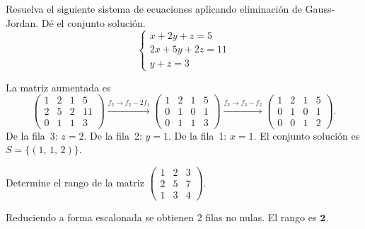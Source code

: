 \documentclass{emate-ucr}
\begin{document}
\begin{ejercicio}[10]
  Resuelva el siguiente sistema de ecuaciones aplicando eliminación de
  Gauss-Jordan. Dé el conjunto solución.
  \[
    \begin{cases}
       x + 2y +  z =  5 \\
      2x + 5y + 2z = 11 \\
           y +  z =  3
    \end{cases}
  \]

  \begin{solucion}
    La matriz aumentada es
    \[
      \left(\begin{array}{ccc|r} 1 & 2 & 1 & 5 \\ 2 & 5 & 2 & 11 \\ 0 & 1 & 1 & 3
      \end{array}\right)
      \xrightarrow{f_2\to f_2-2f_1}
      \left(\begin{array}{ccc|r} 1 & 2 & 1 & 5 \\ 0 & 1 & 0 & 1 \\ 0 & 1 & 1 & 3
      \end{array}\right)
      \xrightarrow{f_3\to f_3-f_2}
      \left(\begin{array}{ccc|r} 1 & 2 & 1 & 5 \\ 0 & 1 & 0 & 1 \\ 0 & 0 & 1 & 2
      \end{array}\right).
    \]
    De la fila~3: $z=2$. De la fila~2: $y=1$. De la fila~1: $x=1$.
    El conjunto solución es $S=\{(1,\,1,\,2)\}$.
  \end{solucion}
\end{ejercicio}

\begin{ejercicio}[5]
  Determine el rango de la matriz
  $\begin{pmatrix} 1 & 2 & 3 \\ 2 & 5 & 7 \\ 1 & 3 & 4 \end{pmatrix}$.

  \begin{solucion}
    Reduciendo a forma escalonada se obtienen 2 filas no nulas.
    El rango es $\mathbf{2}$.
  \end{solucion}
\end{ejercicio}
\end{document}
